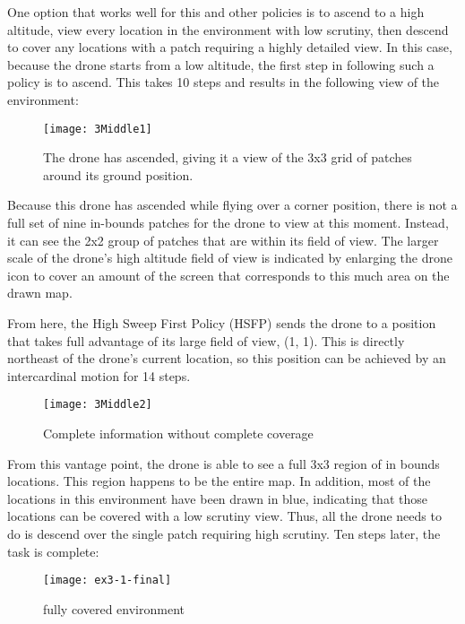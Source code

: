 One option that works well for this and other policies is to ascend to a high altitude, view every location in the environment with low scrutiny, then descend to cover any locations with a patch requiring a highly detailed view. In this case, because the drone starts from a low altitude, the first step in following such a policy is to ascend. This takes 10 steps and results in the following view of the environment:

\begin{figure}[H]
\texttt{[image: 3Middle1]}
\caption[Partially Explored Environment]{The drone has ascended, giving it a view of the 3x3 grid of patches around its ground position.}
\end{figure}

Because this drone has ascended while flying over a corner position, there is not a full set of nine in-bounds patches for the drone to view at this moment. Instead, it can see the 2x2 group of patches that are within its field of view. The larger scale of the drone's high altitude field of view is indicated by enlarging the drone icon to cover an amount of the screen that corresponds to this much area on the drawn map.

From here, the High Sweep First Policy (HSFP) sends the drone to a position that takes full advantage of its large field of view, (1, 1). This is directly northeast of the drone's current location, so this position can be achieved by an intercardinal motion for 14 steps.

\begin{figure}[H]
\texttt{[image: 3Middle2]}
\caption[Complete information without complete coverage]{Complete information without complete coverage}
\end{figure}

From this vantage point, the drone is able to see a full 3x3 region of in bounds locations. This region happens to be the entire map. In addition, most of the locations in this environment have been drawn in blue, indicating that those locations can be covered with a low scrutiny view. Thus, all the drone needs to do is descend over the single patch requiring high scrutiny. Ten steps later, the task is complete:

\begin{figure}[H]
\texttt{[image: ex3-1-final]}
\caption[Fully Covered Environment]{fully covered environment}
\label{fig:3-1-end}
\end{figure}

